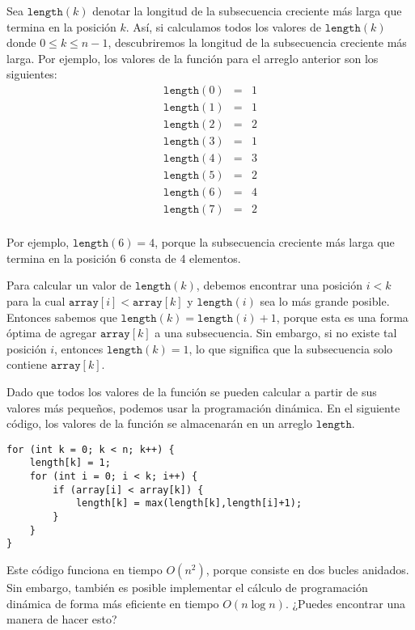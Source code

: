Sea $\texttt{length}(k)$ denotar
la longitud de la
subsecuencia creciente más larga
que termina en la posición $k$.
Así, si calculamos todos los valores de
$\texttt{length}(k)$ donde $0 \le k \le n-1$,
descubriremos la longitud de la
subsecuencia creciente más larga.
Por ejemplo, los valores de la función
para el arreglo anterior son los siguientes:
\[
\begin{array}{lcl}
\texttt{length}(0) & = & 1 \\
\texttt{length}(1) & = & 1 \\
\texttt{length}(2) & = & 2 \\
\texttt{length}(3) & = & 1 \\
\texttt{length}(4) & = & 3 \\
\texttt{length}(5) & = & 2 \\
\texttt{length}(6) & = & 4 \\
\texttt{length}(7) & = & 2 \\
\end{array}
\]

Por ejemplo, $\texttt{length}(6)=4$,
porque la subsecuencia creciente más larga
que termina en la posición 6 consta de 4 elementos.

Para calcular un valor de $\texttt{length}(k)$,
debemos encontrar una posición $i<k$
para la cual $\texttt{array}[i]<\texttt{array}[k]$
y $\texttt{length}(i)$ sea lo más grande posible.
Entonces sabemos que
$\texttt{length}(k)=\texttt{length}(i)+1$,
porque esta es una forma óptima de agregar
$\texttt{array}[k]$ a una subsecuencia.
Sin embargo, si no existe tal posición $i$,
entonces $\texttt{length}(k)=1$,
lo que significa que la subsecuencia solo contiene
$\texttt{array}[k]$.

Dado que todos los valores de la función se pueden calcular
a partir de sus valores más pequeños,
podemos usar la programación dinámica.
En el siguiente código, los valores
de la función se almacenarán en un arreglo
$\texttt{length}$.
\begin{lstlisting}
for (int k = 0; k < n; k++) {
    length[k] = 1;
    for (int i = 0; i < k; i++) {
        if (array[i] < array[k]) {
            length[k] = max(length[k],length[i]+1);
        }
    }
}
\end{lstlisting}

Este código funciona en tiempo $O(n^2)$,
porque consiste en dos bucles anidados.
Sin embargo, también es posible implementar
el cálculo de programación dinámica
de forma más eficiente en tiempo $O(n \log n)$.
¿Puedes encontrar una manera de hacer esto?


